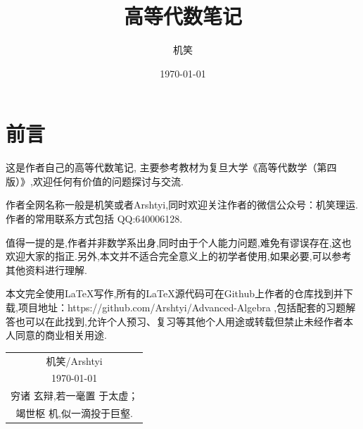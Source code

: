 \documentclass[12pt,a4paper,UTF8,twoside]{ctexbook}
\title{\textbf{高等代数笔记}}
\author{机笑}
\date{\today}
\theoremstyle{mydefinition}
\begin{document}
\thispagestyle{empty}
\maketitle
\thispagestyle{empty}
\newpage
\section*{前言}
\thispagestyle{empty}
这是作者自己的高等代数笔记,
主要参考教材为复旦大学《高等代数学（第四版）》,欢迎任何有价值的问题探讨与交流.

作者全网名称一般是机笑或者Arshtyi,同时欢迎关注作者的微信公众号：机笑理运.作者的常用联系方式包括 QQ:640006128.

值得一提的是,作者并非数学系出身,同时由于个人能力问题,难免有谬误存在,这也欢迎大家的指正.另外,本文并不适合完全意义上的初学者使用,如果必要,可以参考其他资料进行理解.

本文完全使用\LaTeX 写作,所有的\LaTeX 源代码可在Github上作者的仓库找到并下载,项目地址：https://github.com/Arshtyi/Advanced-Algebra ,包括配套的习题解答也可以在此找到,允许个人预习、复习等其他个人用途或转载但禁止未经作者本人同意的商业相关用途.
\begin{flushright}
    \begin{tabular}{c}
        机笑/Arshtyi\\
        \today \\ 穷诸
        玄辩,若一毫置
        于太虚；\\ 竭世枢
        机,似一滴投于巨壑.
    \end{tabular}
\end{flushright}
\thispagestyle{empty}
\newpage
{}
\setcounter{page}{1}
\pagestyle{plain}
\tableofcontents
\newpage
\setcounter{page}{1}
\pagestyle{fancy}
\fancyhf{}
\fancyhead[LO,RE]{\rightmark}
\fancyfoot[LO,RE]{\thepage}









\newpage
{}
\setcounter{page}{1}
\pagestyle{plain}
\nocite{*}

\clearpage
{}
{}

\end{document}
